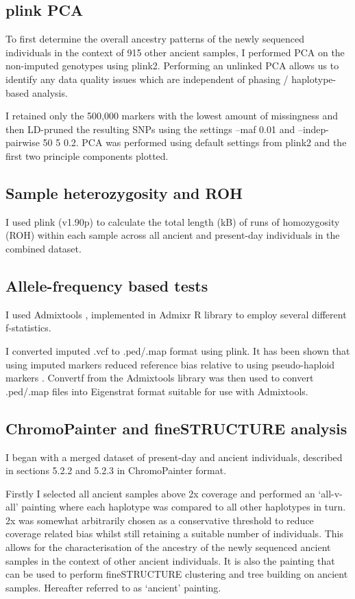 \subsection{plink PCA}

To first determine the overall ancestry patterns of the newly sequenced individuals in the context of 915 other ancient samples, I performed PCA on the non-imputed genotypes using plink2. Performing an unlinked PCA allows us to identify any data quality issues which are independent of phasing / haplotype-based analysis. 

I retained only the 500,000 markers with the lowest amount of missingness and then LD-pruned the resulting SNPs using the settings --maf 0.01 and --indep-pairwise 50 5 0.2. PCA was performed using default settings from plink2 and the first two principle components plotted.

\subsection{Sample heterozygosity and ROH}

I used plink (v1.90p) to calculate the total length (kB) of runs of homozygosity (ROH) within each sample across all ancient and present-day individuals in the combined dataset. 

\subsection{Allele-frequency based tests}

I used Admixtools \cite{Patterson2012}, implemented in Admixr R library \cite{admixrpetr2019} to employ several different f-statistics. 

I converted imputed .vcf to .ped/.map format using plink. It has been shown that using imputed markers reduced reference bias relative to using pseudo-haploid markers \cite{Martiniano2017}. Convertf from the Admixtools library was then used to convert .ped/.map files into Eigenstrat format suitable for use with Admixtools. 

\subsection{ChromoPainter and fineSTRUCTURE analysis}

I began with a merged dataset of present-day and ancient individuals, described in sections 5.2.2 and 5.2.3 in ChromoPainter format. 

Firstly I selected all ancient samples above 2x coverage and performed an `all-v-all' painting where each haplotype was compared to all other haplotypes in turn. 2x was somewhat arbitrarily chosen as a conservative threshold to reduce coverage related bias whilst still retaining a suitable number of individuals. This allows for the characterisation of the ancestry of the newly sequenced ancient samples in the context of other ancient individuals. It is also the painting that can be used to perform fineSTRUCTURE clustering and tree building on ancient samples. Hereafter referred to as `ancient' painting.

